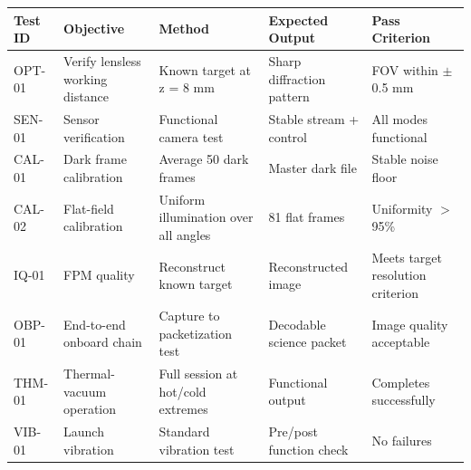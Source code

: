 \begin{longtable}{L{1.8cm}L{3.5cm}L{4.2cm}L{4.2cm}L{2cm}}
\toprule
\textbf{Test ID} & \textbf{Objective} & \textbf{Method} & \textbf{Expected Output} & \textbf{Pass Criterion} \\
\midrule
OPT-01 & Verify lensless working distance & Known target at z = 8 mm & Sharp diffraction pattern & FOV within $\pm$0.5 mm \\
SEN-01 & Sensor verification & Functional camera test & Stable stream + control & All modes functional \\
CAL-01 & Dark frame calibration & Average 50 dark frames & Master dark file & Stable noise floor \\
CAL-02 & Flat-field calibration & Uniform illumination over all angles & 81 flat frames & Uniformity $>$95\% \\
IQ-01 & FPM quality & Reconstruct known target & Reconstructed image & Meets target resolution criterion \\
OBP-01 & End-to-end onboard chain & Capture to packetization test & Decodable science packet & Image quality acceptable \\
THM-01 & Thermal-vacuum operation & Full session at hot/cold extremes & Functional output & Completes successfully \\
VIB-01 & Launch vibration & Standard vibration test & Pre/post function check & No failures \\
\bottomrule
\end{longtable}
